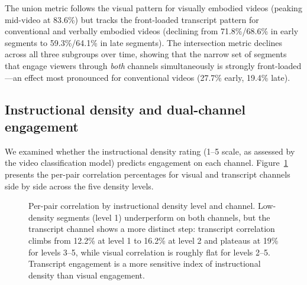 \documentclass[fleqn,10pt]{wlscirep}
\begin{document}
The union metric follows the visual pattern for visually embodied videos (peaking mid-video at 83.6\%) but tracks the front-loaded transcript pattern for conventional and verbally embodied videos (declining from 71.8\%/68.6\% in early segments to 59.3\%/64.1\% in late segments). The intersection metric declines across all three subgroups over time, showing that the narrow set of segments that engage viewers through \emph{both} channels simultaneously is strongly front-loaded---an effect most pronounced for conventional videos (27.7\% early, 19.4\% late).


\subsection*{Instructional density and dual-channel engagement}

We examined whether the instructional density rating (1--5 scale, as assessed by the video classification model) predicts engagement on each channel. Figure~\ref{fig:density} presents the per-pair correlation percentages for visual and transcript channels side by side across the five density levels.

\begin{figure}[ht]
    \centering
    \caption{Per-pair correlation by instructional density level and channel. Low-density segments (level 1) underperform on both channels, but the transcript channel shows a more distinct step: transcript correlation climbs from 12.2\% at level 1 to 16.2\% at level 2 and plateaus at 19\% for levels 3--5, while visual correlation is roughly flat for levels 2--5. Transcript engagement is a more sensitive index of instructional density than visual engagement.}
    \label{fig:density}
\end{figure}
\end{document}
